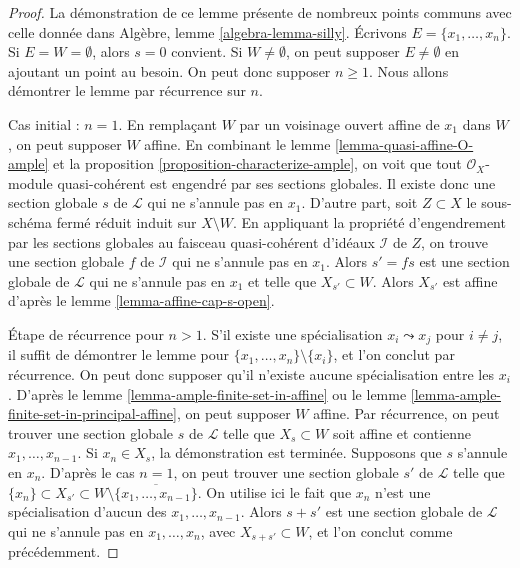 \begin{proof}
La démonstration de ce lemme présente de nombreux points communs avec celle donnée dans
Algèbre, lemme \ref{algebra-lemma-silly}.
Écrivons $E = \{x_1, \ldots, x_n\}$. Si $E = W = \emptyset$, alors $s = 0$
convient. Si $W \not = \emptyset$, on peut supposer $E \not = \emptyset$
en ajoutant un point au besoin. On peut donc supposer $n \geq 1$.
Nous allons démontrer le lemme par récurrence sur $n$.

\medskip\noindent
Cas initial : $n = 1$. En remplaçant $W$ par un voisinage ouvert affine
de $x_1$ dans $W$, on peut supposer $W$ affine. En combinant
le lemme \ref{lemma-quasi-affine-O-ample} et la
proposition \ref{proposition-characterize-ample},
on voit que tout
$\mathcal{O}_X$-module quasi-cohérent est engendré par ses sections globales.
Il existe donc
une section globale $s$ de $\mathcal{L}$ qui ne s'annule pas en $x_1$.
D'autre part, soit $Z \subset X$ le
sous-schéma fermé réduit induit sur $X \setminus W$.
En appliquant la propriété d'engendrement par les sections globales au faisceau quasi-cohérent d'idéaux
$\mathcal{I}$ de $Z$, on trouve une section globale $f$ de $\mathcal{I}$
qui ne s'annule pas en $x_1$. Alors $s' = fs$ est une section globale
de $\mathcal{L}$ qui ne s'annule pas en $x_1$ et telle que
$X_{s'} \subset W$. Alors $X_{s'}$ est affine d'après le
lemme \ref{lemma-affine-cap-s-open}.

\medskip\noindent
Étape de récurrence pour $n > 1$. S'il existe une spécialisation
$x_i \leadsto x_j$ pour $i \not = j$, il suffit
de démontrer le lemme pour $\{x_1, \ldots, x_n\} \setminus \{x_i\}$,
et l'on conclut par récurrence. On peut donc supposer qu'il n'existe aucune
spécialisation entre les $x_i$.
D'après le lemme \ref{lemma-ample-finite-set-in-affine} ou le
lemme \ref{lemma-ample-finite-set-in-principal-affine},
on peut supposer $W$ affine.
Par récurrence, on peut trouver une section globale
$s$ de $\mathcal{L}$ telle que $X_s \subset W$ soit affine et contienne
$x_1, \ldots, x_{n - 1}$. Si $x_n \in X_s$, la démonstration est terminée.
Supposons que $s$ s'annule en $x_n$. D'après le cas $n = 1$, on peut trouver
une section globale $s'$ de $\mathcal{L}$ telle que
$\{x_n\} \subset X_{s'} \subset
W \setminus \overline{\{x_1, \ldots, x_{n - 1}\}}$.
On utilise ici le fait que $x_n$ n'est une spécialisation d'aucun des $x_1, \ldots, x_{n - 1}$.
Alors $s + s'$
est une section globale de $\mathcal{L}$ qui ne s'annule pas
en $x_1, \ldots, x_n$, avec $X_{s + s'} \subset W$,
et l'on conclut comme précédemment.
\end{proof}


